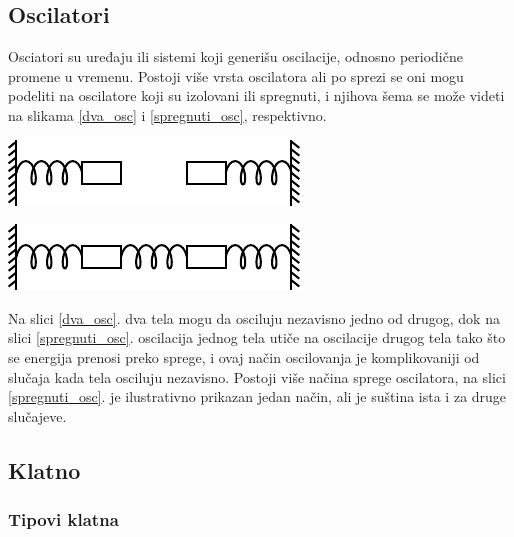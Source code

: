 \documentclass[a4paper, 12pt, diplomski]{etf}
\begin{document}
\subsection{Oscilatori}
Osciatori su uređaju ili sistemi koji generišu oscilacije, odnosno periodične promene u vremenu. Postoji više vrsta oscilatora ali po sprezi se oni mogu podeliti na oscilatore koji su izolovani ili spregnuti, i njihova šema se može videti na slikama \ref{dva_osc} i \ref{spregnuti_osc}, respektivno.

\begin{center}
\begin{minipage}{0.5\textwidth}
\centering
\includegraphics[scale=1.5]{imgs_teorija/dva_odvojena_osc.pdf}
\label{dva_osc}
\end{minipage}%
\begin{minipage}{0.5\textwidth}
\centering
\includegraphics[scale=1.5]{imgs_teorija/spregnuti_osc.pdf} 
\label{spregnuti_osc} 
\end{minipage}
\end{center}

\noindent
Na slici \ref{dva_osc}. dva tela mogu da osciluju nezavisno jedno od drugog, dok na slici \ref{spregnuti_osc}. oscilacija jednog tela utiče na oscilacije drugog tela tako što se energija prenosi preko sprege, i ovaj način oscilovanja je komplikovaniji od slučaja kada tela osciluju nezavisno. Postoji više načina sprege oscilatora, na slici \ref{spregnuti_osc}. je ilustrativno prikazan jedan način, ali je suština ista i za druge slučajeve.


\subsection{Klatno}
\subsubsection{Tipovi klatna}
\label{s:mat_klatno}
\end{document}
